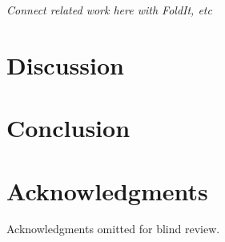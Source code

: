 \documentclass{sigchi}
\begin{document}
\emph{Connect related work here with FoldIt, etc}

\section{Discussion}

\section{Conclusion}

\section{Acknowledgments}
Acknowledgments omitted for blind review.

\balance






\end{document}
